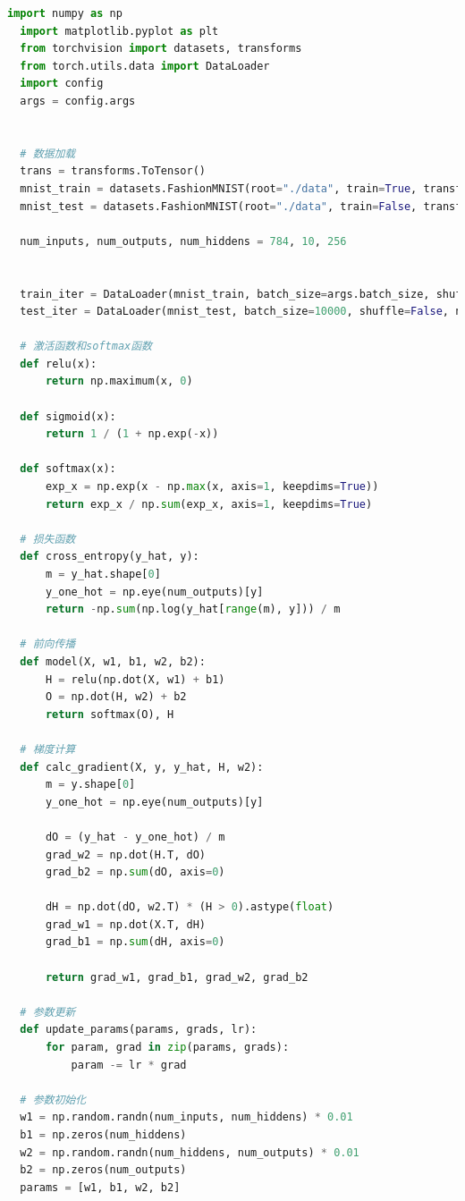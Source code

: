 \documentclass[12pt]{article}
\begin{document}
\begin{lstlisting}[language=Python]
  import numpy as np
  import matplotlib.pyplot as plt
  from torchvision import datasets, transforms
  from torch.utils.data import DataLoader
  import config
  args = config.args
  
  
  # 数据加载
  trans = transforms.ToTensor()
  mnist_train = datasets.FashionMNIST(root="./data", train=True, transform=trans, download=True)
  mnist_test = datasets.FashionMNIST(root="./data", train=False, transform=trans, download=True)
  
  num_inputs, num_outputs, num_hiddens = 784, 10, 256
  
  
  train_iter = DataLoader(mnist_train, batch_size=args.batch_size, shuffle=True, num_workers=0)
  test_iter = DataLoader(mnist_test, batch_size=10000, shuffle=False, num_workers=0)
  
  # 激活函数和softmax函数
  def relu(x):
      return np.maximum(x, 0)
  
  def sigmoid(x):
      return 1 / (1 + np.exp(-x))

  def softmax(x):
      exp_x = np.exp(x - np.max(x, axis=1, keepdims=True))
      return exp_x / np.sum(exp_x, axis=1, keepdims=True)
  
  # 损失函数
  def cross_entropy(y_hat, y):
      m = y_hat.shape[0]
      y_one_hot = np.eye(num_outputs)[y]
      return -np.sum(np.log(y_hat[range(m), y])) / m
  
  # 前向传播
  def model(X, w1, b1, w2, b2):
      H = relu(np.dot(X, w1) + b1)
      O = np.dot(H, w2) + b2
      return softmax(O), H
  
  # 梯度计算
  def calc_gradient(X, y, y_hat, H, w2):
      m = y.shape[0]
      y_one_hot = np.eye(num_outputs)[y]
  
      dO = (y_hat - y_one_hot) / m
      grad_w2 = np.dot(H.T, dO)
      grad_b2 = np.sum(dO, axis=0)
  
      dH = np.dot(dO, w2.T) * (H > 0).astype(float)
      grad_w1 = np.dot(X.T, dH)
      grad_b1 = np.sum(dH, axis=0)
  
      return grad_w1, grad_b1, grad_w2, grad_b2
  
  # 参数更新
  def update_params(params, grads, lr):
      for param, grad in zip(params, grads):
          param -= lr * grad
  
  # 参数初始化
  w1 = np.random.randn(num_inputs, num_hiddens) * 0.01
  b1 = np.zeros(num_hiddens)
  w2 = np.random.randn(num_hiddens, num_outputs) * 0.01
  b2 = np.zeros(num_outputs)
  params = [w1, b1, w2, b2]
  

\end{lstlisting}
\end{document}
